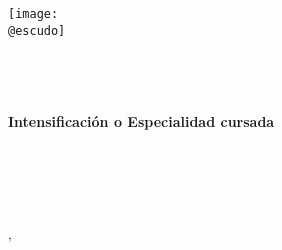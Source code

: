 \begin{titlepage}
    \makeatletter
	\begin{center}
        \vspace{1cm}
		\texttt{[image: \\@escudo]}\vspace{1cm} 
		
		{\LARGE \textbf{\@instEdu\\[0.5ex]
				\@centroEdu\\[2cm]
				\@titulacion}}\\[0.5cm]
        {\large \textbf{Intensificación o Especialidad cursada}}\\[1.5cm] 
		{\LARGE \textbf{\@tipoDoc}}\\[1cm]	
		{\LARGE \@tituloPrimera}\\ \smallskip%
		\ifdefined\@tituloSegunda{\LARGE \@tituloSegunda}\\[3cm]
		\else \phantom{\LARGE	Texto fantasma}\\[3cm]
		\fi
		{\Large \@autor}\vfill%
	\end{center}
	
	\begin{flushright}
		{\Large \ifspanish \@mesTF \else \@monthTF \fi, \@yearTF}
	\end{flushright}
	
    \makeatother
\end{titlepage}







